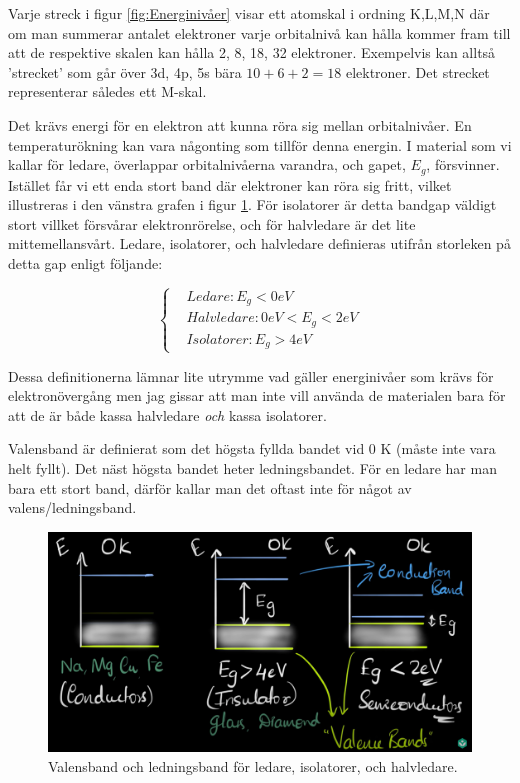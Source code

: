 Varje streck i figur \ref{fig:Energinivåer} visar ett atomskal i ordning K,L,M,N där om man summerar antalet elektroner varje orbitalnivå kan hålla kommer fram till att de respektive skalen kan hålla 2, 8, 18, 32 elektroner. Exempelvis kan alltså 'strecket' som går över 3d, 4p, 5s bära $10 + 6 + 2 = 18$ elektroner. Det strecket representerar således ett M-skal.



Det krävs energi för en elektron att kunna röra sig mellan orbitalnivåer. En temperaturökning kan vara någonting som tillför denna energin. I material som vi kallar för ledare, överlappar orbitalnivåerna varandra, och gapet, $E_g$, försvinner. Istället får vi ett enda stort band där elektroner kan röra sig fritt, vilket illustreras i den vänstra grafen i figur \ref{fig: valens_ledningsband}. För isolatorer är detta bandgap väldigt stort villket försvårar elektronrörelse, och för halvledare är det lite mittemellansvårt. Ledare, isolatorer, och halvledare definieras utifrån storleken på detta gap enligt följande:

\begin{equation}
    \begin{cases}
       & {Ledare: E_g < 0 eV} \\
       & {Halvledare: 0 eV < E_g < 2 eV} \\
       & {Isolatorer: E_g > 4 eV}
    \end{cases}       
\end{equation}

Dessa definitionerna lämnar lite utrymme vad gäller energinivåer som krävs för elektronövergång men jag gissar att man inte vill använda de materialen bara för att de är både kassa halvledare \textit{och} kassa isolatorer.

Valensband är definierat som det högsta fyllda bandet vid 0 K (måste inte vara helt fyllt). Det näst högsta bandet heter ledningsbandet. För en ledare har man bara ett stort band, därför kallar man det oftast inte för något av valens/ledningsband. 

\begin{figure}[ht]
    \centering
    \includegraphics[scale = 0.3]{bilder/gap_iso_halvledare_ledare.PNG}
    \caption{Valensband och ledningsband för ledare, isolatorer, och halvledare.}
    \label{fig: valens_ledningsband}
\end{figure}


